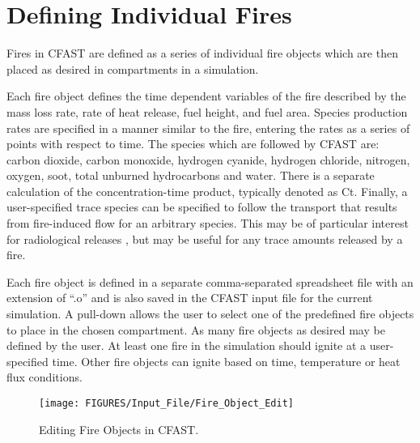 \section{Defining Individual Fires}
\label{sec:fire_inputs}

Fires in CFAST are defined as a series of individual fire objects which are then placed as desired in compartments in a simulation.

Each fire object defines the time dependent variables of the fire described by the mass loss rate, rate of heat release, fuel height, and fuel area.  Species production rates are specified in a manner similar to the fire, entering the rates as a series of points with respect to time.  The species which are followed by CFAST are: carbon dioxide, carbon monoxide, hydrogen cyanide, hydrogen chloride, nitrogen, oxygen, soot, total unburned hydrocarbons and water. There is a separate calculation of the concentration-time product, typically denoted as Ct. Finally, a user-specified trace species can be specified to follow the transport that results from fire-induced flow for an arbitrary species. This may be of particular interest for radiological releases \cite{Jones:2008}, but may be useful for any trace amounts released by a fire.

Each fire object is defined in a separate comma-separated spreadsheet file with an extension of ``.o'' and is also saved in the CFAST input file for the current simulation. A pull-down allows the user to select one of the predefined fire objects to place in the chosen compartment. As many fire objects as desired may be defined by the user.  At least one fire in the simulation should ignite at a user-specified time.  Other fire objects can ignite based on time, temperature or heat flux conditions.

\begin{figure}[h!]
\begin{center}
\texttt{[image: FIGURES/Input\_File/Fire\_Object\_Edit]}
\caption[Editing Fire Objects in CFAST]{Editing Fire Objects in CFAST.}
\end{center}
\end{figure}

